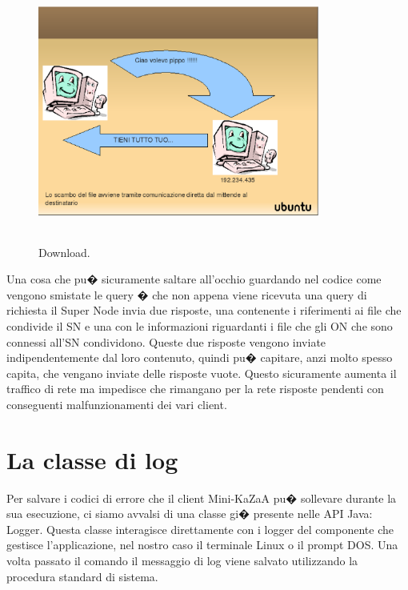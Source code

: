\begin{figure}[t]
 \centering
 \includegraphics[width=350px,height=325px]{images/pluto.eps}
 \caption{Download.}
 \label{fig:download}
\end{figure}

Una cosa che pu� sicuramente saltare all'occhio guardando nel codice come vengono smistate le query � che non appena viene ricevuta una query di richiesta il Super Node invia due risposte, una contenente i riferimenti ai file che condivide il SN e una con le informazioni riguardanti i file che gli ON che sono connessi all'SN condividono.
Queste due risposte vengono inviate indipendentemente dal loro contenuto, quindi pu� capitare, anzi molto spesso capita, che vengano inviate delle risposte vuote. Questo sicuramente aumenta il traffico di rete ma impedisce che rimangano per la rete risposte pendenti con conseguenti malfunzionamenti dei vari client.

\section{La classe di log}
Per salvare i codici di errore che il client Mini-KaZaA pu� sollevare durante la sua esecuzione, ci siamo avvalsi di una classe gi� presente nelle API Java: Logger.
Questa classe interagisce direttamente con i logger del componente che gestisce l'applicazione, nel nostro caso il terminale Linux o il prompt DOS.
Una volta passato il comando il messaggio di log viene salvato utilizzando la procedura standard di sistema.
